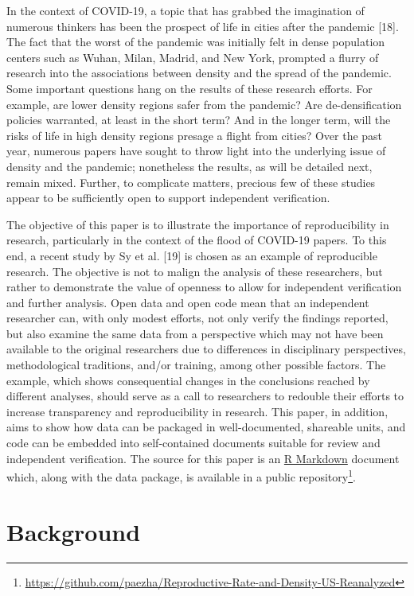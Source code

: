 \documentclass[10pt,letterpaper]{article}
\begin{document}
In the context of COVID-19, a topic that has grabbed the imagination of
numerous thinkers has been the prospect of life in cities after the
pandemic {[}18{]}. The fact that the worst of the pandemic was initially
felt in dense population centers such as Wuhan, Milan, Madrid, and New
York, prompted a flurry of research into the associations between
density and the spread of the pandemic. Some important questions hang on
the results of these research efforts. For example, are lower density
regions safer from the pandemic? Are de-densification policies
warranted, at least in the short term? And in the longer term, will the
risks of life in high density regions presage a flight from cities? Over
the past year, numerous papers have sought to throw light into the
underlying issue of density and the pandemic; nonetheless the results,
as will be detailed next, remain mixed. Further, to complicate matters,
precious few of these studies appear to be sufficiently open to support
independent verification.

The objective of this paper is to illustrate the importance of
reproducibility in research, particularly in the context of the flood of
COVID-19 papers. To this end, a recent study by Sy et al. {[}19{]} is
chosen as an example of reproducible research. The objective is not to
malign the analysis of these researchers, but rather to demonstrate the
value of openness to allow for independent verification and further
analysis. Open data and open code mean that an independent researcher
can, with only modest efforts, not only verify the findings reported,
but also examine the same data from a perspective which may not have
been available to the original researchers due to differences in
disciplinary perspectives, methodological traditions, and/or training,
among other possible factors. The example, which shows consequential
changes in the conclusions reached by different analyses, should serve
as a call to researchers to redouble their efforts to increase
transparency and reproducibility in research. This paper, in addition,
aims to show how data can be packaged in well-documented, shareable
units, and code can be embedded into self-contained documents suitable
for review and independent verification. The source for this paper is an
\href{http://rmarkdown.rstudio.com}{R Markdown} document which, along
with the data package, is available in a public repository\footnote{\url{https://github.com/paezha/Reproductive-Rate-and-Density-US-Reanalyzed}}.

\hypertarget{background}{%
\section{Background}\label{background}}
\end{document}
